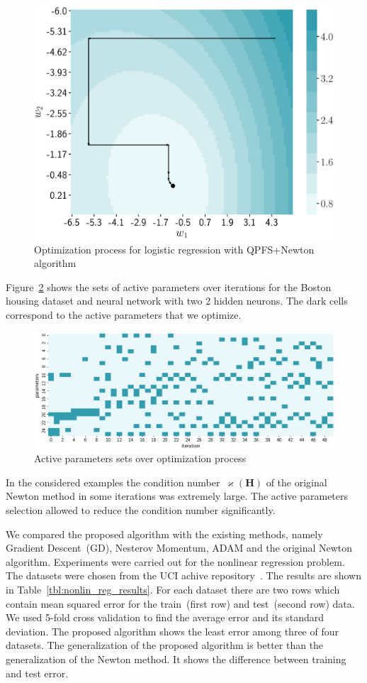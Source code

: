 \documentclass[a4paper,12pt]{article}
\renewcommand{\kappa}{\ensuremath{\varkappa}}
\theoremstyle{plain} %
\theoremstyle{definition} %
\theoremstyle{remark} %
\newcommand{\bH}{\mathbf{H}}
\begin{document}
	\begin{figure}[!h]
		\centering
		\includegraphics[width=0.6\linewidth]{figs/irls_qpfs_2d.eps}	 
		\caption{Optimization process for logistic regression with QPFS+Newton algorithm}
		\label{fig:irls_qpfs_2d}
	\end{figure}

	Figure~\ref{fig:active_params_wrt_iters} shows the sets of active parameters over iterations for the Boston housing dataset and neural network with two 2 hidden neurons. The dark cells correspond to the active parameters that we optimize.

	\begin{figure}[!h]
		\centering
		\includegraphics[width=\linewidth]{figs/active_params_wrt_iters.eps}	 
		\caption{Active parameters sets over optimization process}
		\label{fig:active_params_wrt_iters}
	\end{figure}
	
	In the considered examples the condition number~$\kappa (\bH)$ of the original Newton method in some iterations was extremely large. 
	The active parameters selection allowed to reduce the condition number significantly. 
	
	We compared the proposed algorithm with the existing methods, namely Gradient Descent~(GD), Nesterov Momentum, ADAM and the original Newton algorithm. 
	Experiments were carried out for the nonlinear regression problem. 
	The datasets were chosen from the UCI achive repository~\cite{uci2017}. 
	The results are shown in Table~\ref{tbl:nonlin_reg_results}. 
	For each dataset there are two rows which contain mean squared error for the train~(first row) and test~(second row) data. 
	We used 5-fold cross validation to find the average error and its standard deviation. 
	The proposed algorithm shows the least error among three of four datasets. 
	The generalization of the proposed algorithm is better than the generalization of the Newton method. 
	It shows the difference between training and test error.
	
\end{document}
